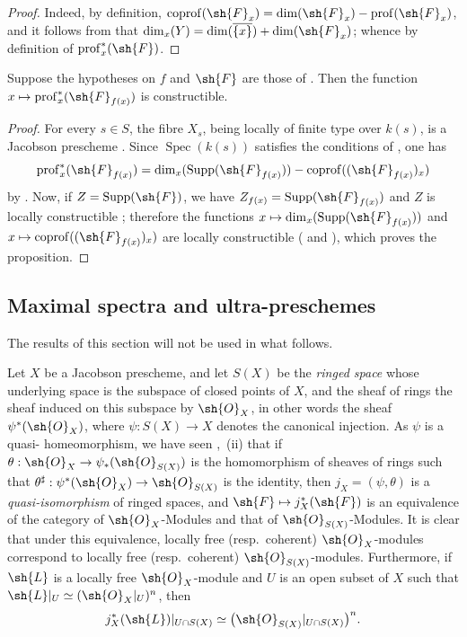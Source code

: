 \begin{proof}
Indeed, by definition, $\operatorname{coprof}(\sh{F}_x)=\dim(\sh{F}_x)-\operatorname{prof}(\sh{F}_x)$, and it follows from  that $\dim_x(Y)=\dim(\overline{\{x\}})+\dim(\sh{F}_x)$; whence  by definition of $\operatorname{prof}^*_x(\sh{F})$.
\end{proof}

\begin{corollary}[10.8.8]
\label{IV.10.8.8}
Suppose the hypotheses on $f$ and $\sh{F}$ are those of . Then the function $x\mapsto\operatorname{prof}^*_x(\sh{F}_{f(x)})$ is constructible.
\end{corollary}

\begin{proof}
For every $s\in S$, the fibre $X_s$, being locally of finite type over $k(s)$, is a Jacobson prescheme . Since $\operatorname{Spec}(k(s))$ satisfies the conditions of , one has
\[
  \operatorname{prof}^*_x(\sh{F}_{f(x)})
  =\dim_x(\operatorname{Supp}(\sh{F}_{f(x)}))
   -\operatorname{coprof}((\sh{F}_{f(x)})_x)
\]
by .
Now, if $Z=\operatorname{Supp}(\sh{F})$, we have $Z_{f(x)}=\operatorname{Supp}(\sh{F}_{f(x)})$  and $Z$ is locally constructible ; therefore the functions $x\mapsto\dim_x(\operatorname{Supp}(\sh{F}_{f(x)}))$ and $x\mapsto\operatorname{coprof}((\sh{F}_{f(x)})_x)$ are locally constructible ( and ), which proves the proposition.
\end{proof}

\subsection{Maximal spectra and ultra-preschemes}
\label{subsection:IV.10.9}

The results of this section will not be used in what follows.

\begin{env}[10.9.1]
\label{IV.10.9.1}
Let $X$ be a Jacobson prescheme, and let $S(X)$ be the \emph{ringed space} whose underlying space is the subspace of closed points of $X$, and the sheaf of rings the sheaf induced on this subspace by $\sh{O}_X$, in other words the sheaf $\psi^*(\sh{O}_X)$, where $\psi:S(X)\to X$ denotes the canonical injection.
As $\psi$ is a quasi-
homeomorphism, we have seen ,~(ii) that if $\theta:\sh{O}_X\to\psi_*(\sh{O}_{S(X)})$ is the homomorphism of sheaves of rings such that $\theta^\sharp:\psi^*(\sh{O}_X)\to\sh{O}_{S(X)}$ is the identity, then $j_X=(\psi,\theta)$ is a \emph{quasi-isomorphism} of ringed spaces, and $\sh{F}\mapsto j_X^*(\sh{F})$ is an equivalence of the category of $\sh{O}_X$-Modules and that of $\sh{O}_{S(X)}$-Modules.
It is clear that under this equivalence, locally free (resp.\ coherent) $\sh{O}_X$-modules correspond to locally free (resp.\ coherent) $\sh{O}_{S(X)}$-modules. Furthermore, if $\sh{L}$ is a locally free $\sh{O}_X$-module and $U$ is an open subset of $X$ such that $\sh{L}|_U\simeq(\sh{O}_X|_U)^n$, then
\[
  j_X^*(\sh{L})|_{U\cap S(X)}
  \simeq \bigl(\sh{O}_{S(X)}|_{U\cap S(X)}\bigr)^n.
\]
\end{env}

